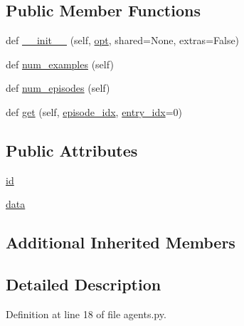 \subsection*{Public Member Functions}
\begin{DoxyCompactItemize}
\item 
def \hyperlink{classparlai_1_1tasks_1_1dialogue__nli_1_1agents_1_1DialogueNliTeacher_ab6931a1fbc88ffc407f35ba72cc44b76}{\+\_\+\+\_\+init\+\_\+\+\_\+} (self, \hyperlink{classparlai_1_1core_1_1agents_1_1Teacher_a3ce6243860ce978a897922863ed32fa4}{opt}, shared=None, extras=False)
\item 
def \hyperlink{classparlai_1_1tasks_1_1dialogue__nli_1_1agents_1_1DialogueNliTeacher_a54d9ea8b89d8b5b91c913612fba74726}{num\+\_\+examples} (self)
\item 
def \hyperlink{classparlai_1_1tasks_1_1dialogue__nli_1_1agents_1_1DialogueNliTeacher_a1277b756af5d3ca234c77526a7bfb5e2}{num\+\_\+episodes} (self)
\item 
def \hyperlink{classparlai_1_1tasks_1_1dialogue__nli_1_1agents_1_1DialogueNliTeacher_aa3dfbefa7098aa0336896dd7ac5698b9}{get} (self, \hyperlink{classparlai_1_1core_1_1teachers_1_1FixedDialogTeacher_afd4ebab8063eb42d182d30a1a41f133e}{episode\+\_\+idx}, \hyperlink{classparlai_1_1core_1_1teachers_1_1FixedDialogTeacher_ae3201b15f3c3b46a2f3511bad9b43e7d}{entry\+\_\+idx}=0)
\end{DoxyCompactItemize}
\subsection*{Public Attributes}
\begin{DoxyCompactItemize}
\item 
\hyperlink{classparlai_1_1tasks_1_1dialogue__nli_1_1agents_1_1DialogueNliTeacher_aec219032386350b637684f9ab46a09ab}{id}
\item 
\hyperlink{classparlai_1_1tasks_1_1dialogue__nli_1_1agents_1_1DialogueNliTeacher_ae213e3aeb7ef16760a0c62ff1f77454e}{data}
\end{DoxyCompactItemize}
\subsection*{Additional Inherited Members}


\subsection{Detailed Description}


Definition at line 18 of file agents.\+py.




